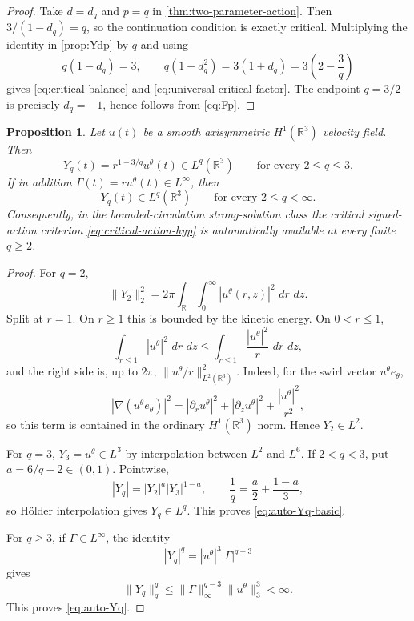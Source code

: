 \documentclass[11pt]{article}
\numberwithin{equation}{section}
\newtheorem{proposition}[proposition]{Proposition}
\theoremstyle{definition}
\newcommand{\R}{\mathbb R}
\newcommand{\dd}{\,d}
\begin{document}
\begin{proof}
Take $d=d_q$ and $p=q$ in \cref{thm:two-parameter-action}.  Then
$3/(1-d_q)=q$, so the continuation condition is exactly critical.  Multiplying the identity in \cref{prop:Ydp} by $q$ and using
\[
 q(1-d_q)=3,
 \qquad
 q(1-d_q^2)=3(1+d_q)=3\left(2-\frac3q\right)
\]
gives \eqref{eq:critical-balance} and \eqref{eq:universal-critical-factor}.  The endpoint $q=3/2$ is precisely $d_q=-1$, hence follows from \eqref{eq:Fp}.
\end{proof}

\begin{proposition}\label{prop:automatic-critical-mass}
Let $u(t)$ be a smooth axisymmetric $H^1(\R^3)$ velocity field.  Then
\begin{equation}\label{eq:auto-Yq-basic}
 Y_q(t)=r^{1-3/q}u^\theta(t)\in L^q(\R^3)
 \qquad\text{for every }2\le q\le3.
\end{equation}
If in addition $\Gamma(t)=ru^\theta(t)\in L^\infty$, then
\begin{equation}\label{eq:auto-Yq}
 Y_q(t)\in L^q(\R^3)
 \qquad\text{for every }2\le q<\infty.
\end{equation}
Consequently, in the bounded-circulation strong-solution class the critical signed-action criterion \eqref{eq:critical-action-hyp} is automatically available at every finite $q\ge2$.
\end{proposition}

\begin{proof}
For $q=2$,
\[
 \|Y_2\|_2^2
 =2\pi\int_\R\int_0^\infty |u^\theta(r,z)|^2\,\dd r\,\dd z.
\]
Split at $r=1$.  On $r\ge1$ this is bounded by the kinetic energy.  On $0<r\le1$,
\[
 \int_{r\le1}|u^\theta|^2\,\dd r\,\dd z
 \le\int_{r\le1}\frac{|u^\theta|^2}{r}\,\dd r\,\dd z,
\]
and the right side is, up to $2\pi$, $\|u^\theta/r\|_{L^2(\R^3)}^2$.  Indeed, for the swirl vector $u^\theta e_\theta$,
\[
 |\nabla(u^\theta e_\theta)|^2
 =|\partial_r u^\theta|^2+|\partial_z u^\theta|^2+\frac{|u^\theta|^2}{r^2},
\]
so this term is contained in the ordinary $H^1(\R^3)$ norm.  Hence $Y_2\in L^2$.

For $q=3$, $Y_3=u^\theta\in L^3$ by interpolation between $L^2$ and $L^6$.  If $2<q<3$, put $a=6/q-2\in(0,1)$.  Pointwise,
\[
 |Y_q|=|Y_2|^a|Y_3|^{1-a},
 \qquad
 \frac1q=\frac a2+\frac{1-a}{3},
\]
so H\"older interpolation gives $Y_q\in L^q$.  This proves \eqref{eq:auto-Yq-basic}.

For $q\ge3$, if $\Gamma\in L^\infty$, the identity
\begin{equation}\label{eq:Yq-Gamma-interp}
 |Y_q|^q=|u^\theta|^3|\Gamma|^{q-3}
\end{equation}
gives
\[
 \|Y_q\|_q^q
 \le\|\Gamma\|_\infty^{q-3}\|u^\theta\|_3^3<\infty.
\]
This proves \eqref{eq:auto-Yq}.
\end{proof}
\end{document}
